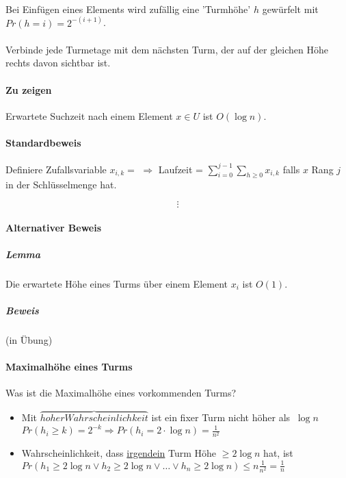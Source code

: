 \paragraph*{} Bei Einfügen eines Elements wird zufällig eine 'Turmhöhe' $h$ gewürfelt mit $Pr(h=i)=2^{-(i+1)}$.

\paragraph*{} Verbinde jede Turmetage mit dem nächsten Turm, der auf der gleichen Höhe rechts davon sichtbar ist.


\paragraph*{Zu zeigen} Erwartete Suchzeit nach einem Element $x \in U$ ist $O(\log n)$.

\paragraph*{Standardbeweis} Definiere Zufallsvariable $x_{i,k} = $ %
$\Rightarrow$ Laufzeit = $\sum\limits_{i=0}^{j-1} \sum\limits_{h \geq 0} x_{i,k}$ falls $x$ Rang $j$ in der Schlüsselmenge hat.

$$\vdots$$

\paragraph*{Alternativer Beweis}
\subparagraph*{Lemma} Die erwartete Höhe eines Turms über einem Element $x_i$ ist $O(1)$.
\subparagraph*{Beweis} (in Übung)

\paragraph*{Maximalhöhe eines Turms} Was ist die Maximalhöhe eines vorkommenden Turms?
\begin{itemize}
	\item Mit $\overbrace{hoher Wahrscheinlichkeit}$%
	ist ein fixer Turm nicht höher als $~ \log n$ %
	$Pr(h_i \geq k) = 2^{-k} \Rightarrow Pr(h_i = 2 \cdot \log n) = \frac{1}{n^2}$
	\item Wahrscheinlichkeit, dass \underline{irgendein} Turm Höhe $\geq 2 \log n$ hat, ist $Pr(h_1 \geq 2 \log n \lor h_2 \geq 2 \log n \lor \dots \lor h_n \geq 2 \log n) \leq n \frac{1}{n^2} = \frac{1}{n}$ %
\end{itemize}
